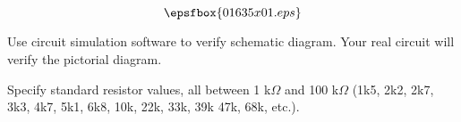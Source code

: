 

$$\epsfbox{01635x01.eps}$$

\vfil \eject






Use circuit simulation software to verify schematic diagram.  Your real circuit will verify the pictorial diagram.







Specify standard resistor values, all between 1 k$\Omega$ and 100 k$\Omega$ (1k5, 2k2, 2k7, 3k3, 4k7, 5k1, 6k8, 10k, 22k, 33k, 39k 47k, 68k, etc.).





